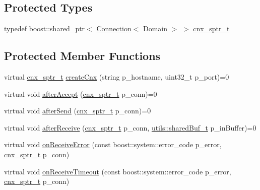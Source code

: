 \subsection*{Protected Types}
\begin{DoxyCompactItemize}
\item 
typedef boost\+::shared\+\_\+ptr$<$ \hyperlink{classxtd_1_1network_1_1base_1_1Connection}{Connection}$<$ Domain $>$ $>$ \hyperlink{classxtd_1_1network_1_1base_1_1Server_aea8c26b2edf1f6c8802db01b3c6b6036}{cnx\+\_\+sptr\+\_\+t}
\end{DoxyCompactItemize}
\subsection*{Protected Member Functions}
\begin{DoxyCompactItemize}
\item 
virtual \hyperlink{classxtd_1_1network_1_1base_1_1Server_aea8c26b2edf1f6c8802db01b3c6b6036}{cnx\+\_\+sptr\+\_\+t} \hyperlink{classxtd_1_1network_1_1base_1_1Server_a4ab9c2f5d30622f1ca4166c7126a16f5}{create\+Cnx} (string p\+\_\+hostname, uint32\+\_\+t p\+\_\+port)=0
\item 
virtual void \hyperlink{classxtd_1_1network_1_1base_1_1Server_a872b44334ff62df80a5a19502ca867b2}{after\+Accept} (\hyperlink{classxtd_1_1network_1_1base_1_1Server_aea8c26b2edf1f6c8802db01b3c6b6036}{cnx\+\_\+sptr\+\_\+t} p\+\_\+conn)=0
\item 
virtual void \hyperlink{classxtd_1_1network_1_1base_1_1Server_a64224be1bf7d053bfbbbaf5c6be00f31}{after\+Send} (\hyperlink{classxtd_1_1network_1_1base_1_1Server_aea8c26b2edf1f6c8802db01b3c6b6036}{cnx\+\_\+sptr\+\_\+t} p\+\_\+conn)=0
\item 
virtual void \hyperlink{classxtd_1_1network_1_1base_1_1Server_a29450e21c9aba7147eb26ac9563efd01}{after\+Receive} (\hyperlink{classxtd_1_1network_1_1base_1_1Server_aea8c26b2edf1f6c8802db01b3c6b6036}{cnx\+\_\+sptr\+\_\+t} p\+\_\+conn, \hyperlink{namespacextd_1_1network_1_1utils_a92b366b7e2a1ab09ac4f4a0401f8fb84}{utils\+::shared\+Buf\+\_\+t} p\+\_\+in\+Buffer)=0
\item 
virtual void \hyperlink{classxtd_1_1network_1_1base_1_1Server_a5fb03fd67e85a6315c0b591f12feaaeb}{on\+Receive\+Error} (const boost\+::system\+::error\+\_\+code p\+\_\+error, \hyperlink{classxtd_1_1network_1_1base_1_1Server_aea8c26b2edf1f6c8802db01b3c6b6036}{cnx\+\_\+sptr\+\_\+t} p\+\_\+conn)
\item 
virtual void \hyperlink{classxtd_1_1network_1_1base_1_1Server_a2692cfb3f754e05b032564a289ea361c}{on\+Receive\+Timeout} (const boost\+::system\+::error\+\_\+code p\+\_\+error, \hyperlink{classxtd_1_1network_1_1base_1_1Server_aea8c26b2edf1f6c8802db01b3c6b6036}{cnx\+\_\+sptr\+\_\+t} p\+\_\+conn)

\end{DoxyCompactItemize}
